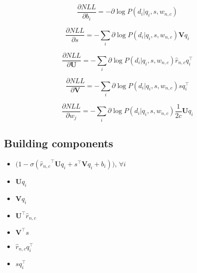 \documentclass[12pt]{article}
\newcommand{\trans}[1]{{#1}^{\top}}
\newcommand{\sigmoid}[1]{\sigma\left(#1\right)}
\newcommand{\ww}{\mathbf{U}}
\newcommand{\ws}{\mathbf{V}}
\begin{document}
\begin{equation}
  \frac{\partial NLL}{\partial b_i}=-\partial\log P(d_i|q_i,s,w_{n,c})
\end{equation}

\begin{equation}
  \frac{\partial NLL}{\partial s}=-\sum_i\partial\log P(d_i|q_i,s,w_{n,c})\ws q_i
\end{equation}

\begin{equation}
  \frac{\partial NLL}{\partial \ww}= -\sum_i\partial\log P(d_i|q_i,s,w_{n,c}) \hat{r}_{n,c}\trans{q}_i
\end{equation}

\begin{equation}
  \frac{\partial NLL}{\partial \ws}= -\sum_i\partial\log P(d_i|q_i,s,w_{n,c}) s\trans{q}_i
\end{equation}

\begin{equation}
  \frac{\partial NLL}{\partial w_j}= -\sum_i \partial\log P(d_i|q_i,s,w_{n,c}) \frac{1}{2c}\ww q_i
\end{equation}

\subsection{Building components}
\begin{itemize}
\item $\Big(1-\sigmoid{\trans{\hat{r}_{n,c}}\ww q_i + \trans{s}\ws q_i + b_i}\Big)$, $\forall i$
\item $\ww q_i$
\item $\ws q_i$
\item $\trans{\ww}\hat{r}_{n,c}$
\item $\trans{\ws}s$
\item $\hat{r}_{n,c}\trans{q}_i$
\item $s\trans{q}_i$
\end{itemize}

\end{document}
